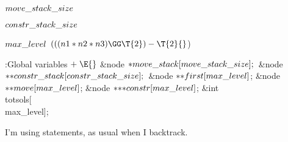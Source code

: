 \Y\B\4\D$\\{move\_stack\_size}$ \5
\par
\B\4\D$\\{constr\_stack\_size}$ \5
\par
\B\4\D$\\{max\_level}$ \5
$(((\\{n1}*\\{n2}*\\{n3})\GG\T{2})-\T{2}{}$)\par
\Y\B\4:Global variables\X${}\mathrel+\E{}$\6
\&{node} ${}{*}\\{move\_stack}[\\{move\_stack\_size}];{}$\6
\&{node} ${}{*}{*}\\{constr\_stack}[\\{constr\_stack\_size}];{}$\6
\&{node} ${}{*}{*}\\{first}[\\{max\_level}]{}$;\6
\&{node} ${}{*}{*}\\{move}[\\{max\_level}]{}$;%
\6
\&{node} ${}{*}{*}{*}\\{constr}[\\{max\_level}]{}$;\6
\&{int} \\{totsols}[\\{max\_level}];\par
\fi

I'm using  statements, as usual when I
backtrack.

